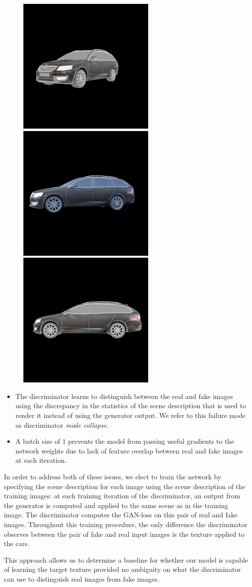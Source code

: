 \begin{figure}[t]
    \includegraphics[width=.19\linewidth]{graphics/results_3_model.png}
    \includegraphics[width=.19\linewidth]{graphics/results_4_model.png}
    \includegraphics[width=.19\linewidth]{graphics/results_5_model.png}
\end{figure}

\begin{itemize}
\renewcommand\labelitemi{--}
    \item The discriminator learns to distinguish between the real and fake images using
        the discrepancy in the statistics of the scene description that is used to render it
        instead of using the generator output. We refer to this failure mode as discriminator
        \emph{mode collapse}.
    \item A batch size of $1$ prevents the model from passing useful gradients to the network
        weights due to lack of feature overlap between real and fake images at each iteration.
\end{itemize}

In order to address both of these issues, we elect to train the network by specifying the
scene description for each image using the scene description of the training images: at each
training iteration of the discriminator, an output from the generator is computed and applied
to the same scene as in the training image. The discriminator computes the GAN-loss on this
pair of real and fake images. Throughout this training procedure, the only difference the
discriminator observes between the pair of fake and real input images is the texture applied
to the cars.

This approach allows us to determine a baseline for whether our model is capable of learning
the target texture provided no ambiguity on what the discriminator can use to distinguish
real images from fake images.

